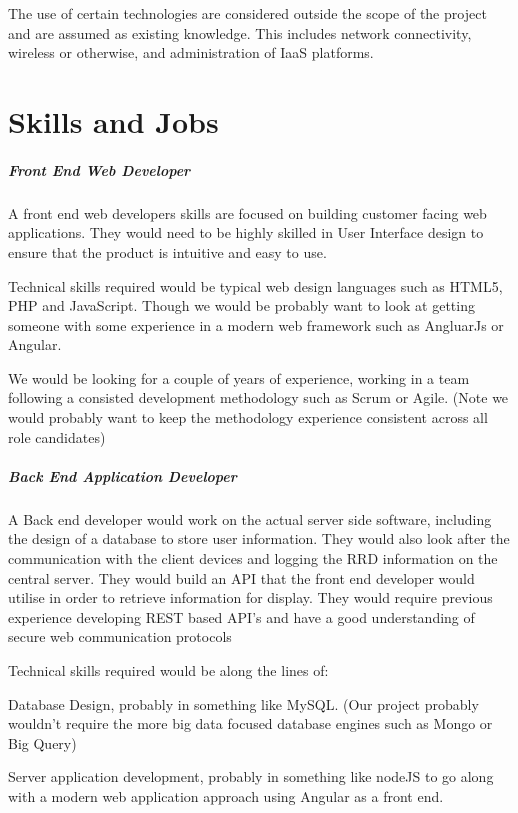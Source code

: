 \documentclass[11pt, oneside, a4paper, titlepage]{article}
\begin{document}
The use of certain technologies are considered outside the scope of the project and are assumed as existing knowledge.  This includes network connectivity, wireless or otherwise, and administration of IaaS platforms. 


\part{Skills and Jobs}
\subsubsection{Front End Web Developer}
A front end web developers skills are focused on building customer facing web applications. They would need to be highly skilled in User Interface design to ensure that the product is intuitive and easy to use. 

Technical skills required would be typical web design languages such as HTML5, PHP and JavaScript. Though we would be probably want to look at getting someone with some experience in a modern web framework such as AngluarJs or Angular. 

We would be looking for a couple of years of experience, working in a team following a consisted development methodology such as Scrum or Agile.  (Note we would probably want to keep the methodology experience consistent across all role candidates)  

\subsubsection{Back End Application Developer}
A Back end developer would work on the actual server side software, including the design of a database to store user information.  They would also look after the communication with the client devices and logging the RRD information on the central server.  They would build an API that the front end developer would utilise in order to retrieve information for display.  They would require previous experience developing REST based API's and have a good understanding of secure web communication protocols 

Technical skills required would be along the lines of: 

Database Design, probably in something like MySQL. (Our project probably wouldn't require the more big data focused database engines such as Mongo or Big Query) 

Server application development, probably in something like nodeJS to go along with a modern web application approach using Angular as a front end. 
\end{document}
